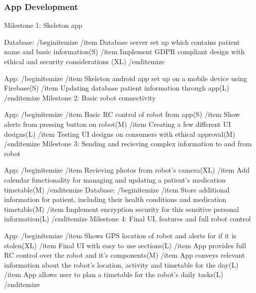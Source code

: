 \documentclass{article}
\begin{document}
\subsubsection{App Development}

Milestone 1: Skeleton app

Database:
/begin{itemize}
/item Database server set up which contains patient name and basic information(S)
/item Implement GDPR compliant design with ethical and security considerations (XL)
/end{itemize}
    
App:
/begin{itemize}
/item Skeleton android app set up on a mobile device using Firebase(S)
/item Updating database patient information through app(L)
/end{itemize}    
Milestone 2: Basic robot connectivity

App:
/begin{itemize}
/item Basic RC control of robot from app(S)
/item Show alerts from pressing button on robot(M)
/item Creating a few different UI designs(L)
/item Testing UI designs on consumers with ethical approval(M)
/end{itemize}
Milestone 3: Sending and recieving complex information to and from robot

App:
/begin{itemize}
/item Recieving photos from robot's camera(XL)
/item Add calendar functionality for managing and updating a patient's medication timetable(M)
/end{itemize}
Database:
/begin{itemize}
/item Store additional information for patient, including their health conditions and medication timetable(M)
/item Implement encryption security for this sensitive personal information(L)
/end{itemize}
Milestone 4: Final UI, features and full robot control

App:
/begin{itemize}
/item Shows GPS location of robot and alerts for if it is stolen(XL)
/item Final UI with easy to use sections(L)
/item App provides full RC control over the robot and it's components(M)
/item App conveys relevant information about the robot's location, activity and timetable for the day(L)
/item App allows user to plan a timetable for the robot's daily tasks(L)
/end{itemize}
    



\end{document}
